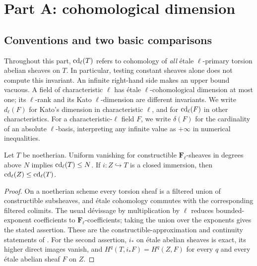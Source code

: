 \section{Part A: cohomological dimension}
\label{A:section}

\subsection{Conventions and two basic comparisons}

Throughout this part, $\operatorname{cd}_\ell(T)$ refers to cohomology of \emph{all} étale $\ell$-primary torsion abelian sheaves on $T$. In particular, testing constant sheaves alone does not compute this invariant. An infinite right-hand side makes an upper bound vacuous. A field of characteristic $\ell$ has étale $\ell$-cohomological dimension at most one; its $\ell$-rank and its Kato $\ell$-dimension are different invariants. We write $d_\ell(F)$ for Kato's dimension in characteristic $\ell$, and for $\operatorname{cd}_\ell(F)$ in other characteristics. For a characteristic-$\ell$ field $F$, we write $\delta(F)$ for the cardinality of an absolute $\ell$-basis, interpreting any infinite value as $+\infty$ in numerical inequalities.

\begin{lemma}
\label{A:basic}
Let $T$ be noetherian. Uniform vanishing for constructible $\mathbf F_\ell$-sheaves in degrees above $N$ implies $\operatorname{cd}_\ell(T)\leq N$. If $i:Z\hookrightarrow T$ is a closed immersion, then $\operatorname{cd}_\ell(Z)\leq\operatorname{cd}_\ell(T)$.
\end{lemma}
\begin{proof}
On a noetherian scheme every torsion sheaf is a filtered union of constructible subsheaves, and étale cohomology commutes with the corresponding filtered colimits. The usual dévissage by multiplication by $\ell$ reduces bounded-exponent coefficients to $\mathbf F_\ell$-coefficients; taking the union over the exponents gives the stated assertion. These are the constructible-approximation and continuity statements of \citet[Exposés VI, \S5, and IX, \S2]{A_SGA4}. For the second assertion, $i_*$ on étale abelian sheaves is exact, its higher direct images vanish, and $H^q(T,i_*F)=H^q(Z,F)$ for every $q$ and every étale abelian sheaf $F$ on $Z$.
\end{proof}

